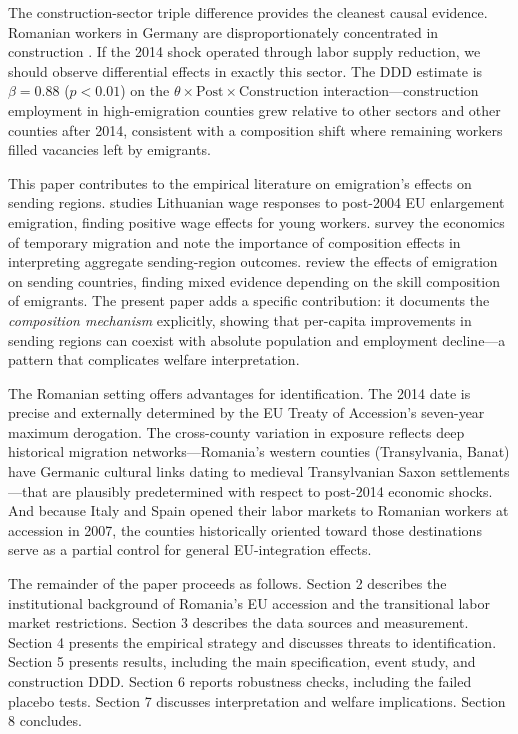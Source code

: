 \documentclass[12pt]{article}
\begin{document}
The construction-sector triple difference provides the cleanest causal evidence. Romanian workers in Germany are disproportionately concentrated in construction \citep{sandu2010romania}. If the 2014 shock operated through labor supply reduction, we should observe differential effects in exactly this sector. The DDD estimate is $\beta = 0.88$ ($p < 0.01$) on the $\theta \times \text{Post} \times \text{Construction}$ interaction---construction employment in high-emigration counties grew relative to other sectors and other counties after 2014, consistent with a composition shift where remaining workers filled vacancies left by emigrants.

This paper contributes to the empirical literature on emigration's effects on sending regions. \citet{elsner2013emigration} studies Lithuanian wage responses to post-2004 EU enlargement emigration, finding positive wage effects for young workers. \citet{dustmann2015economics} survey the economics of temporary migration and note the importance of composition effects in interpreting aggregate sending-region outcomes. \citet{ambrosini2015effects} review the effects of emigration on sending countries, finding mixed evidence depending on the skill composition of emigrants. The present paper adds a specific contribution: it documents the \textit{composition mechanism} explicitly, showing that per-capita improvements in sending regions can coexist with absolute population and employment decline---a pattern that complicates welfare interpretation.

The Romanian setting offers advantages for identification. The 2014 date is precise and externally determined by the EU Treaty of Accession's seven-year maximum derogation. The cross-county variation in exposure reflects deep historical migration networks---Romania's western counties (Transylvania, Banat) have Germanic cultural links dating to medieval Transylvanian Saxon settlements \citep{sandu2010romania}---that are plausibly predetermined with respect to post-2014 economic shocks. And because Italy and Spain opened their labor markets to Romanian workers at accession in 2007, the counties historically oriented toward those destinations serve as a partial control for general EU-integration effects.

The remainder of the paper proceeds as follows. Section 2 describes the institutional background of Romania's EU accession and the transitional labor market restrictions. Section 3 describes the data sources and measurement. Section 4 presents the empirical strategy and discusses threats to identification. Section 5 presents results, including the main specification, event study, and construction DDD. Section 6 reports robustness checks, including the failed placebo tests. Section 7 discusses interpretation and welfare implications. Section 8 concludes.
\end{document}
